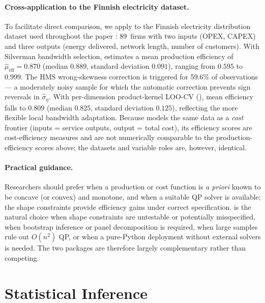 \documentclass[article]{jss}
\begin{document}
\paragraph{Cross-application to the Finnish electricity dataset.}
To facilitate direct comparison, we apply  to the Finnish
electricity distribution dataset used throughout the 
paper \citep{DaiFangLeeKuosmanen2024}: 89~firms with two inputs
(OPEX, CAPEX) and three outputs (energy delivered, network length,
number of customers).
With Silverman bandwidth selection,  estimates a mean
production efficiency of $\hat\mu_{\mathrm{eff}} = 0.870$ (median
$0.889$, standard deviation $0.091$), ranging from $0.595$ to $0.999$.
The HMS wrong-skewness correction is triggered for 59.6\% of
observations --- a moderately noisy sample for which the automatic
correction prevents sign reversals in $\hat\sigma_\eta$.
With per-dimension product-kernel LOO-CV (),
mean efficiency falls to $0.809$ (median $0.825$, standard deviation
$0.125$), reflecting the more flexible local bandwidth adaptation.
Because  models the same data as a \emph{cost} frontier
(inputs = service outputs, output = total cost), its efficiency scores
are cost-efficiency measures and are not numerically comparable to the
production-efficiency scores above; the datasets and variable roles
are, however, identical.

\paragraph{Practical guidance.}
Researchers should prefer  when a production or cost
function is \emph{a priori} known to be concave (or convex) and
monotone, and when a suitable QP solver is available; the shape
constraints provide efficiency gains under correct specification.
 is the natural choice when shape constraints are
untestable or potentially misspecified, when bootstrap inference or
panel decomposition is required, when large samples rule out $O(n^2)$
QP, or when a pure-Python deployment without external solvers is
needed.  The two packages are therefore largely complementary rather
than competing.



\section[Statistical inference]{Statistical Inference}
\label{sec:inference}
\end{document}
